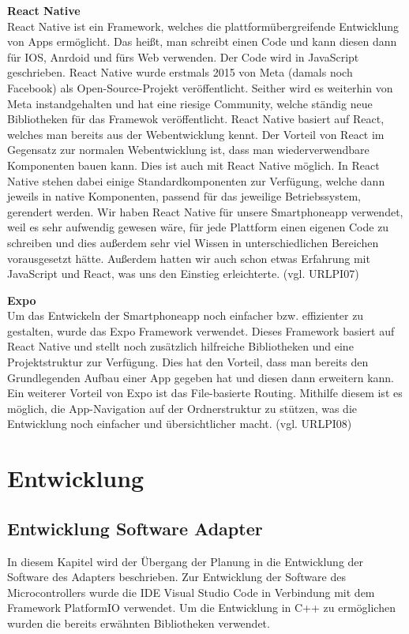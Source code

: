 \documentclass[]{article}
\begin{document}
\textbf{React Native} \\
React Native ist ein Framework, welches die plattformübergreifende Entwicklung von Apps ermöglicht. Das heißt, man schreibt einen Code und kann diesen dann für IOS, Anrdoid und fürs Web verwenden. Der Code wird in JavaScript geschrieben. React Native wurde erstmals 2015 von Meta (damals noch Facebook) als Open-Source-Projekt veröffentlicht. Seither wird es weiterhin von Meta instandgehalten und hat eine riesige Community, welche ständig neue Bibliotheken für das Framewok veröffentlicht. React Native basiert auf React, welches man bereits aus der Webentwicklung kennt. Der Vorteil von React im Gegensatz zur normalen Webentwicklung ist, dass man wiederverwendbare Komponenten bauen kann. Dies ist auch mit React Native möglich. In React Native stehen dabei einige Standardkomponenten zur Verfügung, welche dann jeweils in native Komponenten, passend für das jeweilige Betriebssystem, gerendert werden. 
Wir haben React Native für unsere Smartphoneapp verwendet, weil es sehr aufwendig gewesen wäre, für jede Plattform einen eigenen Code zu schreiben und dies außerdem sehr viel Wissen in unterschiedlichen Bereichen vorausgesetzt hätte. Außerdem hatten wir auch schon etwas Erfahrung mit JavaScript und React, was uns den Einstieg erleichterte.
(vgl. URLPI07)

\textbf{Expo} \\
Um das Entwickeln der Smartphoneapp noch einfacher bzw. effizienter zu gestalten, wurde das Expo Framework verwendet. Dieses Framework basiert auf React Native und stellt noch zusätzlich hilfreiche Bibliotheken und eine Projektstruktur zur Verfügung. Dies hat den Vorteil, dass man bereits den Grundlegenden Aufbau einer App gegeben hat und diesen dann erweitern kann. Ein weiterer Vorteil von Expo ist das File-basierte Routing. Mithilfe diesem ist es möglich, die App-Navigation auf der Ordnerstruktur zu stützen, was die Entwicklung noch einfacher und übersichtlicher macht.
(vgl. URLPI08)

\section{Entwicklung}
\subsection{Entwicklung Software Adapter}
In diesem Kapitel wird der Übergang der Planung in die Entwicklung der Software des Adapters beschrieben. 
Zur Entwicklung der Software des Microcontrollers wurde die IDE Visual Studio Code in Verbindung mit dem Framework PlatformIO verwendet. Um die Entwicklung in C++ zu ermöglichen wurden die bereits erwähnten Bibliotheken verwendet.
\end{document}
